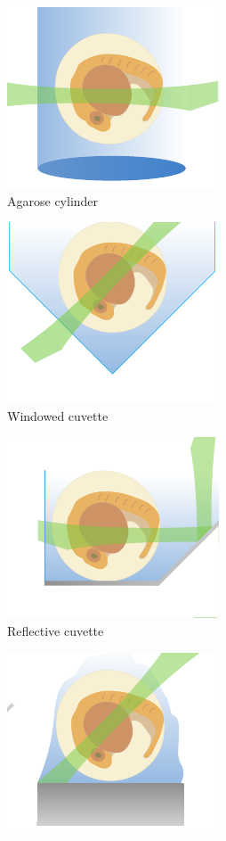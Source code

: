 \begin{figure}
    \centering
    \begin{subfigure}[b]{0.4\linewidth}
         \centering
        \includegraphics{mounting_strategies_fish_cartoon/fep}
         \caption{Agarose cylinder}
    \end{subfigure}
    \begin{subfigure}[b]{0.4\linewidth}
             \centering
        \includegraphics{mounting_strategies_fish_cartoon/cuvette}
         \caption{Windowed cuvette}
    \end{subfigure}
    \begin{subfigure}[b]{0.4\linewidth}
             \centering
        \includegraphics{mounting_strategies_fish_cartoon/mirrored}
         \caption{Reflective cuvette}
    \end{subfigure}
    \begin{subfigure}[b]{0.4\linewidth}
             \centering
        \includegraphics{mounting_strategies_fish_cartoon/pedestal}

\end{subfigure}
\end{figure}
